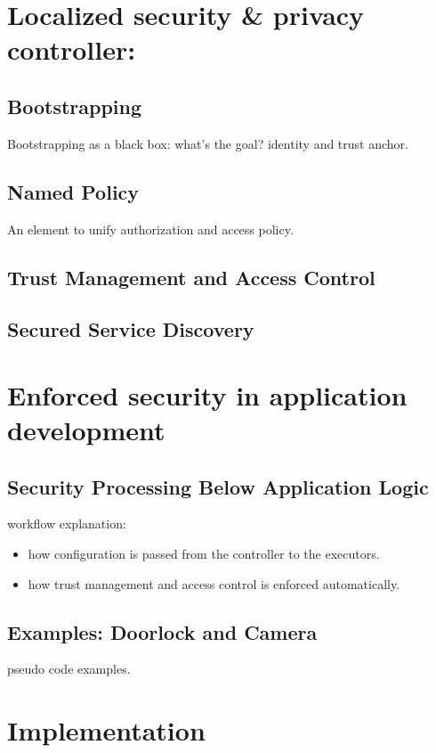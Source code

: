 \section{Localized security \& privacy controller:}

\subsection{Bootstrapping}
Bootstrapping as a black box: what's the goal? identity and trust anchor.

\subsection{Named Policy}
An element to unify authorization and access policy.

\subsection{Trust Management and Access Control}

\subsection{Secured Service Discovery}

\section{Enforced security in application development}

\subsection{Security Processing Below Application Logic}

workflow explanation:
\begin{itemize}
	\item how configuration is passed from the controller to the executors.
	\item how trust management and access control is enforced automatically.
\end{itemize}

\subsection{Examples: Doorlock and Camera}

pseudo code examples.

\section{Implementation}

